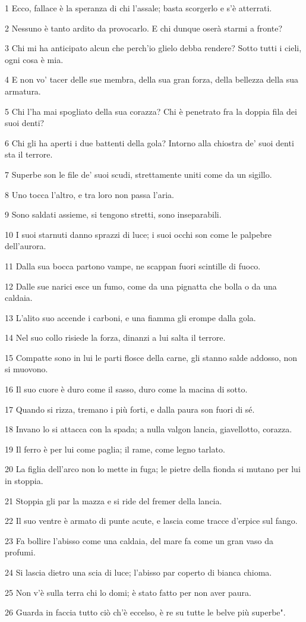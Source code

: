 \par 1 Ecco, fallace è la speranza di chi l'assale; basta scorgerlo e s'è atterrati.
\par 2 Nessuno è tanto ardito da provocarlo. E chi dunque oserà starmi a fronte?
\par 3 Chi mi ha anticipato alcun che perch'io glielo debba rendere? Sotto tutti i cieli, ogni cosa è mia.
\par 4 E non vo' tacer delle sue membra, della sua gran forza, della bellezza della sua armatura.
\par 5 Chi l'ha mai spogliato della sua corazza? Chi è penetrato fra la doppia fila dei suoi denti?
\par 6 Chi gli ha aperti i due battenti della gola? Intorno alla chiostra de' suoi denti sta il terrore.
\par 7 Superbe son le file de' suoi scudi, strettamente uniti come da un sigillo.
\par 8 Uno tocca l'altro, e tra loro non passa l'aria.
\par 9 Sono saldati assieme, si tengono stretti, sono inseparabili.
\par 10 I suoi starnuti danno sprazzi di luce; i suoi occhi son come le palpebre dell'aurora.
\par 11 Dalla sua bocca partono vampe, ne scappan fuori scintille di fuoco.
\par 12 Dalle sue narici esce un fumo, come da una pignatta che bolla o da una caldaia.
\par 13 L'alito suo accende i carboni, e una fiamma gli erompe dalla gola.
\par 14 Nel suo collo risiede la forza, dinanzi a lui salta il terrore.
\par 15 Compatte sono in lui le parti flosce della carne, gli stanno salde addosso, non si muovono.
\par 16 Il suo cuore è duro come il sasso, duro come la macina di sotto.
\par 17 Quando si rizza, tremano i più forti, e dalla paura son fuori di sé.
\par 18 Invano lo si attacca con la spada; a nulla valgon lancia, giavellotto, corazza.
\par 19 Il ferro è per lui come paglia; il rame, come legno tarlato.
\par 20 La figlia dell'arco non lo mette in fuga; le pietre della fionda si mutano per lui in stoppia.
\par 21 Stoppia gli par la mazza e si ride del fremer della lancia.
\par 22 Il suo ventre è armato di punte acute, e lascia come tracce d'erpice sul fango.
\par 23 Fa bollire l'abisso come una caldaia, del mare fa come un gran vaso da profumi.
\par 24 Si lascia dietro una scia di luce; l'abisso par coperto di bianca chioma.
\par 25 Non v'è sulla terra chi lo domi; è stato fatto per non aver paura.
\par 26 Guarda in faccia tutto ciò ch'è eccelso, è re su tutte le belve più superbe".


